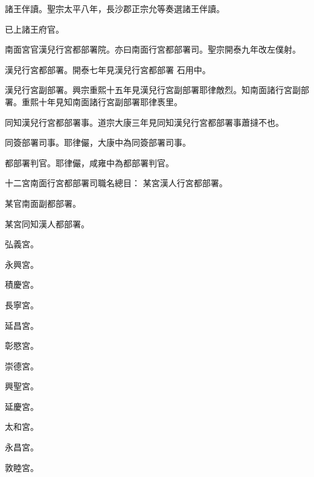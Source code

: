 \begin{pinyinscope}
 諸王伴讀。聖宗太平八年，長沙郡正宗允等奏選諸王伴讀。



 已上諸王府官。



 南面宮官漢兒行宮都部署院。亦曰南面行宮都部署司。聖宗開泰九年改左僕射。



 漢兒行宮都部署。開泰七年見漢兒行宮都部署
 石用中。



 漢兒行宮副部署。興宗重熙十五年見漢兒行宮副部署耶律敵烈。知南面諸行宮副部署。重熙十年見知南面諸行宮副部署耶律褭里。



 同知漢兒行宮都部署事。道宗大康三年見同知漢兒行宮都部署事蕭撻不也。



 同簽部署司事。耶律儼，大康中為同簽部署司事。



 都部署判官。耶律儼，咸雍中為都部署判官。



 十二宮南面行宮都部署司職名總目：
 某宮漢人行宮都部署。



 某官南面副都部署。



 某宮同知漢人都部署。



 弘義宮。



 永興宮。



 積慶宮。



 長寧宮。



 延昌宮。



 彰愍宮。



 崇德宮。



 興聖宮。



 延慶宮。



 太和宮。



 永昌宮。



 敦睦宮。



\end{pinyinscope}